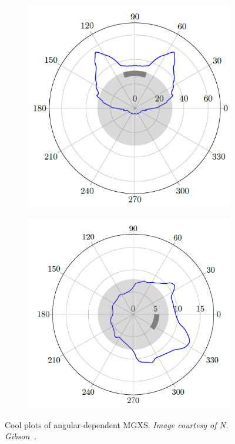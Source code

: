 \begin{figure}[H]
\begin{subfigure}{.5\textwidth}
  \centering
  \includegraphics[width=\linewidth]{figures/sph/batman-1}
  \caption{}
\end{subfigure}
\begin{subfigure}{.5\textwidth}
  \centering
  \includegraphics[width=\linewidth]{figures/sph/batman-2}
  \caption{}
\end{subfigure}
\caption[Batman plots]{Cool plots of angular-dependent \ac{MGXS}. \textit{Image courtesy of N. Gibson~\cite{gibson2016thesis}.}}
\label{fig:chap6-batman-plots}
\end{figure}


